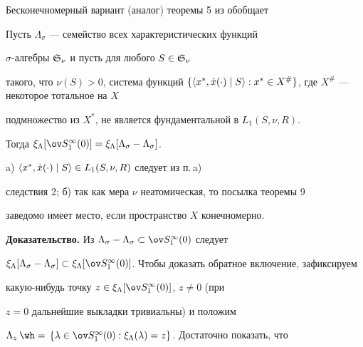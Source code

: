  


Бесконечномерный вариант (аналог) теоремы 5 из \cite{2} обобщает 


 


\begin{thm} 


Пусть $\Lambda_\sigma$ --- семейство всех характеристических функций 


$\sigma$-алгебры $\frak S_\nu$ и пусть для любого $S\in\frak S_\nu$ 


такого, что $\nu(S)>0$, система функций $\{\la x^*,\Dot x(\cdot)\mid 


S\ra:x^*\in X^{\#}\}$, где $X^{\#}$ --- некоторое тотальное на $X$ 


подмножество из $X^*$, не является фундаментальной в $L_1(S,\nu,R)$. 


Тогда $\xi_\Lambda[\ov 


S^\infty_1(0)]=\xi_\Lambda[\Lambda_\sigma-\Lambda_\sigma]$. 


\end{thm} 


 


\begin{note} 


a) $\langle x^*,\Dot x(\cdot)\mid S\rangle\in L_1(S,\nu,R)$ следует из п.\,a) 


следствия 2; б) так как мера $\nu$ неатомическая, то посылка теоремы 9 


заведомо имеет место, если пространство $X$ конечномерно. 


\end{note} 


 


{\bf Доказательство.} Из $\Lambda_\sigma-\Lambda_\sigma\subset \ov 


S^\infty_1(0)$ следует 


$\xi_\Lambda[\Lambda_\sigma-\Lambda_\sigma]\subset \xi_\Lambda[\ov 


S^\infty_1(0)]$. Чтобы доказать обратное включение, зафиксируем 


какую-нибудь точку $z\in\xi_\Lambda[\ov S^\infty_1(0)]$, $z\ne0$ (при 


$z=0$ дальнейшие выкладки тривиальны) и положим 


$\Lambda_z\hateq\{\lambda\in\ov 


S^\infty_1(0):\xi_\Lambda(\lambda)=z\}$. Достаточно показать, что 


